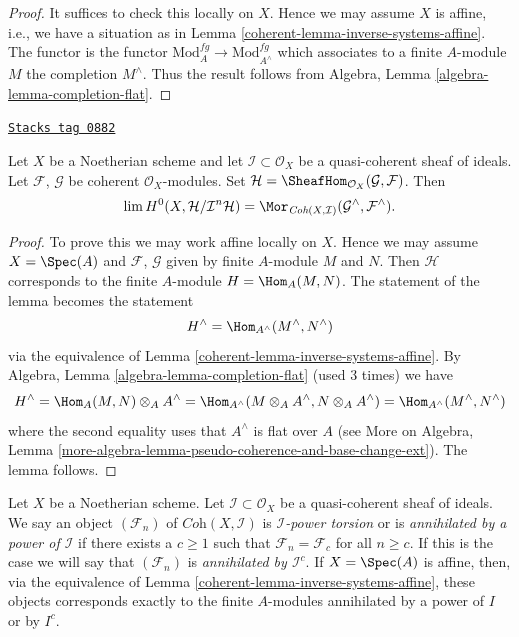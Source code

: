\begin{proof}

It suffices to check this locally on $X$. Hence we may assume $X$ is
affine, i.e., we have a situation as in
Lemma \ref{coherent-lemma-inverse-systems-affine}.
The functor is the functor $\text{Mod}^{fg}_A \to \text{Mod}^{fg}_{A^\wedge}$
which associates to a finite $A$-module $M$ the completion $M^\wedge$.
Thus the result follows from
Algebra, Lemma \ref{algebra-lemma-completion-flat}.
\end{proof}

\begin{lemma}
\label{coherent-lemma-completion-internal-hom}
\href{https://stacks.math.columbia.edu/tag/0882}{\texttt{Stacks tag 0882}}

Let $X$ be a Noetherian scheme and let $\mathcal{I} \subset \mathcal{O}_X$
be a quasi-coherent sheaf of ideals. Let $\mathcal{F}$, $\mathcal{G}$ be
coherent $\mathcal{O}_X$-modules. Set
$\mathcal{H} = \SheafHom_{\mathcal{O}_X}(\mathcal{G}, \mathcal{F})$.
Then
$$
\lim H^0(X, \mathcal{H}/\mathcal{I}^n\mathcal{H}) =
\Mor_{\textit{Coh}(X, \mathcal{I})}
(\mathcal{G}^\wedge, \mathcal{F}^\wedge).
$$
\end{lemma}

\begin{proof}

To prove this we may work affine locally on $X$.
Hence we may assume $X = \Spec(A)$ and $\mathcal{F}$, $\mathcal{G}$
given by finite $A$-module $M$ and $N$. Then $\mathcal{H}$
corresponds to the finite $A$-module $H = \Hom_A(M, N)$.
The statement of the lemma becomes the statement
$$
H^\wedge = \Hom_{A^\wedge}(M^\wedge, N^\wedge)
$$
via the equivalence of Lemma \ref{coherent-lemma-inverse-systems-affine}.
By Algebra, Lemma \ref{algebra-lemma-completion-flat}
(used 3 times) we have
$$
H^\wedge = \Hom_A(M, N) \otimes_A A^\wedge =
\Hom_{A^\wedge}(M \otimes_A A^\wedge, N \otimes_A A^\wedge) =
\Hom_{A^\wedge}(M^\wedge, N^\wedge)
$$
where the second equality uses that $A^\wedge$ is flat over $A$
(see More on Algebra, Lemma
\ref{more-algebra-lemma-pseudo-coherence-and-base-change-ext}).
The lemma follows.
\end{proof}

Let $X$ be a Noetherian scheme. Let $\mathcal{I} \subset \mathcal{O}_X$
be a quasi-coherent sheaf of ideals. We say an object $(\mathcal{F}_n)$ of
$\textit{Coh}(X, \mathcal{I})$ is {\it $\mathcal{I}$-power torsion}
or is {\it annihilated by a power of $\mathcal{I}$} if there exists
a $c \geq 1$ such that $\mathcal{F}_n = \mathcal{F}_c$ for all $n \geq c$.
If this is the case we will say that $(\mathcal{F}_n)$ is {\it annihilated by
$\mathcal{I}^c$}. If $X = \Spec(A)$ is affine, then, via the equivalence of
Lemma \ref{coherent-lemma-inverse-systems-affine},
these objects corresponds exactly to the finite $A$-modules
annihilated by a power of $I$ or by $I^c$.


